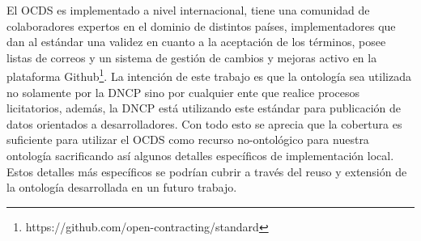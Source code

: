     

El OCDS es implementado a nivel internacional, tiene una comunidad de colaboradores expertos en el dominio de distintos países, implementadores que dan al estándar una validez en cuanto a la aceptación de los términos, posee listas de correos y un sistema de gestión de cambios y mejoras activo en la plataforma Github\footnote{https://github.com/open-contracting/standard}. La intención de este trabajo es que la ontología sea utilizada no solamente por la DNCP sino por cualquier ente que realice procesos licitatorios, además, la DNCP está utilizando este estándar para publicación de datos orientados a desarrolladores. Con todo esto se aprecia que la cobertura es suficiente para utilizar el OCDS como recurso no-ontológico para nuestra ontología sacrificando así algunos detalles específicos de implementación local. Estos detalles más específicos se podrían cubrir a través del reuso y extensión de la ontología desarrollada en un futuro trabajo.
